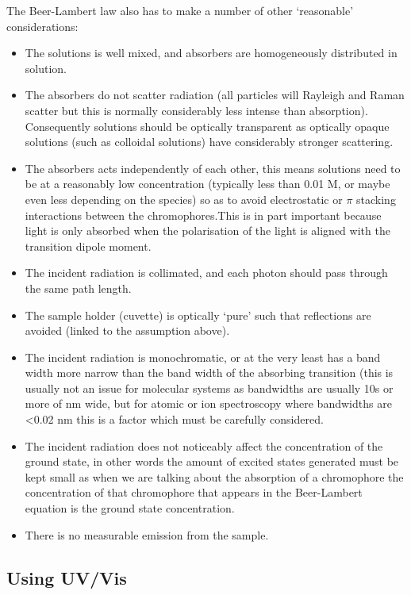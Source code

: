 \documentclass[
]{book}
\providecommand{\tightlist}{%
  \setlength{\itemsep}{0pt}\setlength{\parskip}{0pt}}
\begin{document}
The Beer-Lambert law also has to make a number of other `reasonable' considerations:

\begin{itemize}
\tightlist
\item
  The solutions is well mixed, and absorbers are homogeneously distributed in solution.
\item
  The absorbers do not scatter radiation (all particles will Rayleigh and Raman scatter but this is normally considerably less intense than absorption). Consequently solutions should be optically transparent as optically opaque solutions (such as colloidal solutions) have considerably stronger scattering.
\item
  The absorbers acts independently of each other, this means solutions need to be at a reasonably low concentration (typically less than 0.01 M, or maybe even less depending on the species) so as to avoid electrostatic or \(\pi\) stacking interactions between the chromophores.This is in part important because light is only absorbed when the polarisation of the light is aligned with the transition dipole moment.
\item
  The incident radiation is collimated, and each photon should pass through the same path length.
\item
  The sample holder (cuvette) is optically `pure' such that reflections are avoided (linked to the assumption above).
\item
  The incident radiation is monochromatic, or at the very least has a band width more narrow than the band width of the absorbing transition (this is usually not an issue for molecular systems as bandwidths are usually 10s or more of nm wide, but for atomic or ion spectroscopy where bandwidths are \textless0.02 nm this is a factor which must be carefully considered.
\item
  The incident radiation does not noticeably affect the concentration of the ground state, in other words the amount of excited states generated must be kept small as when we are talking about the absorption of a chromophore the concentration of that chromophore that appears in the Beer-Lambert equation is the ground state concentration.
\item
  There is no measurable emission from the sample.
\end{itemize}

\hypertarget{sec:usingUV}{%
\subsection{Using UV/Vis}\label{sec:usingUV}}
\end{document}
